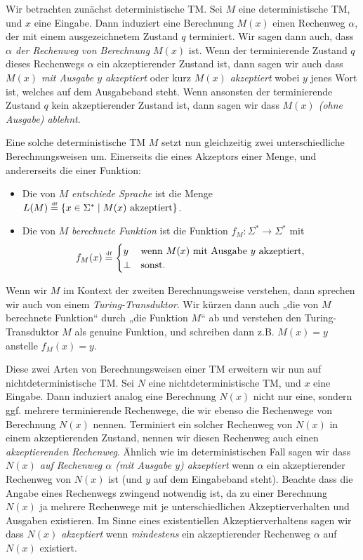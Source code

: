 Wir betrachten zunächst deterministische TM.
Sei $M$ eine deterministische TM, und $x$ eine Eingabe. Dann induziert eine Berechnung $M(x)$ einen Rechenweg $\alpha$, der mit einem ausgezeichnetem Zustand $q$ terminiert. 
Wir sagen dann auch, dass \emph{$\alpha$ der Rechenweg von Berechnung $M(x)$} ist.
Wenn der terminierende Zustand $q$ dieses Rechenwegs $\alpha$ ein akzeptierender Zustand ist,
dann sagen wir auch dass \emph{$M(x)$ mit Ausgabe $y$ akzeptiert} oder kurz \emph{$M(x)$ akzeptiert} wobei $y$ jenes Wort ist, welches auf dem Ausgabeband steht.
Wenn ansonsten der terminierende Zustand $q$ kein akzeptierender Zustand ist, dann sagen wir dass \emph{$M(x)$ (ohne Ausgabe) ablehnt}.

Eine solche deterministische TM $M$ setzt nun gleichzeitig zwei unterschiedliche Berechnungsweisen um. Einerseits die eines Akzeptors einer Menge, und andererseits die einer Funktion:
\begin{itemize}
    \item Die von $M$ \emph{entschiede  Sprache} ist die Menge $L(M)\stackrel{\text{\smash{\tiny df}}}{=}\{ x\in\Sigma^* \mid M(x) \text{ akzeptiert} \}$.
    \item Die von $M$ \emph{berechnete Funktion} ist die Funktion $f_M\colon\Sigma^*\to\Sigma^*$ mit
        \[ f_M(x) \stackrel{\text{\smash{\tiny df}}}{=} \begin{cases} y & \text{wenn $M(x)$ mit Ausgabe $y$ akzeptiert,} \\ \bot & \text{sonst.} \end{cases} \] 
\end{itemize}
Wenn wir $M$ im Kontext der zweiten Berechnungsweise verstehen, dann sprechen wir auch von einem \emph{Turing-Transduktor}. 
Wir kürzen dann auch „die von $M$ berechnete Funktion“ durch „die Funktion $M$“ ab und verstehen den Turing-Transduktor $M$ als genuine Funktion, und schreiben dann z.B. $M(x)=y$ anstelle $f_M(x)=y$.

Diese zwei Arten von Berechnungsweisen einer TM erweitern wir nun auf nichtdeterministische TM. 
Sei  $N$ eine nichtdeterministische TM, und $x$ eine Eingabe. Dann induziert analog eine Berechnung $N(x)$ nicht nur eine, sondern ggf. mehrere terminierende Rechenwege, die wir ebenso die Rechenwege von Berechnung $N(x)$ nennen. Terminiert ein solcher Rechenweg von $N(x)$ in einem akzeptierenden Zustand, nennen wir diesen Rechenweg auch einen \emph{akzeptierenden Rechenweg}.
Ähnlich wie im deterministischen Fall sagen wir dass \emph{$N(x)$ auf Rechenweg $\alpha$ (mit Ausgabe $y$) akzeptiert}  wenn $\alpha$ ein akzeptierender Rechenweg von $N(x)$ ist (und $y$ auf dem Eingabeband steht).
Beachte dass die Angabe eines Rechenwegs zwingend notwendig ist, da zu einer Berechnung $N(x)$ ja mehrere Rechenwege mit je unterschiedlichen Akzeptierverhalten und Ausgaben existieren.
Im Sinne eines existentiellen Akzeptierverhaltens sagen wir dass \emph{$N(x)$ akzeptiert} wenn \emph{mindestens} ein akzeptierender Rechenweg $\alpha$ auf $N(x)$ existiert.


